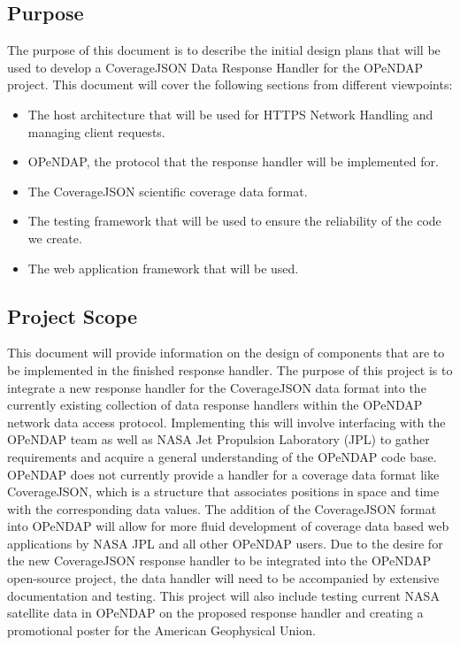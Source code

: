 \documentclass[onecolumn, draftclsnofoot,10pt, compsoc]{IEEEtran}
\begin{document}
\subsection{Purpose} 
The purpose of this document is to describe the initial design plans that will be used to develop a \gls{CoverageJSON} Data Response Handler for the OPeNDAP project. This document will cover the following sections from different viewpoints:
\begin{itemize}
\item The host architecture that will be used for \gls{HTTPS} Network Handling and managing client requests. 
\item OPeNDAP, the protocol that the response handler will be implemented for.
\item The CoverageJSON scientific coverage data format.
\item The testing framework that will be used to ensure the reliability of the code we create.
\item The web application framework that will be used.
\end{itemize}

\subsection{Project Scope}
This document will provide information on the design of components that are to be implemented in the finished response handler. The purpose of this project is to integrate a new response handler for the CoverageJSON data format into the currently existing collection of data response handlers within the OPeNDAP network data access protocol. Implementing this will involve interfacing with the OPeNDAP team as well as NASA Jet Propulsion Laboratory (JPL) to gather requirements and acquire a general understanding of the OPeNDAP code base. OPeNDAP does not currently provide a handler for a coverage data format like CoverageJSON, which is a structure that associates positions in space and time with the corresponding data values. The addition of the CoverageJSON format into OPeNDAP will allow for more fluid development of coverage data based web applications by NASA JPL and all other OPeNDAP users. Due to the desire for the new CoverageJSON response handler to be integrated into the OPeNDAP open-source project, the data handler will need to be accompanied by extensive documentation and testing. This project will also include testing current NASA satellite data in OPeNDAP on the proposed response handler and creating a promotional poster for the American Geophysical Union.
\end{document}
